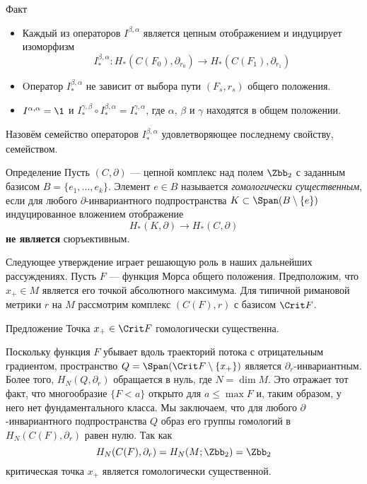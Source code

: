 \begin{thm}{Факт}\label{13.2.E}
  \begin{itemize}
  \item
    Каждый из операторов $I^{\beta,\alpha}$ является цепным
    отображением и индуцирует изоморфизм
    \[
    I^{\beta,\alpha}_{*} :
    H_{*}(C(F_{0}),\partial_{r_{0}}) \to
    H_{*}(C(F_{1}),\partial_{r_{1}})
    \]
  \item
    Oператор $I^{\beta,\alpha}_{*}$ не зависит от выбора пути
    $(F_{s},r_{s})$ общего положения.
  \item
    $I^{\alpha,\alpha}=\1$ и $I^{\gamma,\beta}_{*}\circ
    I^{\beta,\alpha}_{*}=I^{\gamma,\alpha}_{*}$, где $\alpha$, $\beta$ и
    $\gamma$ находятся в общем положении.
  \end{itemize}
\end{thm}

Назовём семейство операторов $I^{\beta,\alpha}_{*}$ удовлетворяющее
последнему свойству,  семейством. 

\begin{ex}{Определение}\label{13.2.F}
Пусть $(C, \partial)$ --- цепной комплекс над полем $\Zbb_{2}$ с заданным базисом $B = \{e_{1},\dots,e_{k}\}$.
Элемент $e\in B$ называется \emph{гомологически существенным}, если для
любого $\partial$-инвариантного подпространства $K\subset \Span(B\setminus \{e\})$ индуцированное вложением отображение
\[
H_{*}(K,\partial)\to H_{*}(C,\partial)
\]
\textbf{не является} сюръективным.
\end{ex}

Следующее утверждение играет решающую роль в наших дальнейших рассуждениях.
Пусть $F$ — функция Морса общего положения.
Предположим, что $x_{+}\in M$ является его  точкой
абсолютного максимума. 
Для типичной римановой метрики $r$ на $M$ рассмотрим комплекс
$(C(F),r)$ с базисом $\Crit F$. 

\begin{thm}{Предложение}\label{13.2.G}
  Точка $x_{+}\in\Crit F$ гомологически существенна.  
\end{thm}

 Поскольку функция $F$
убывает вдоль траекторий потока с отрицательным градиентом,
пространство
$Q \z= \Span(\Crit F \setminus \{x_{+}\})$ является $\partial_{r}$-инвариантным.
Более того, $H_{N}(Q,\partial_{r})$ обращается в нуль, где $N = \dim M$.
Это отражает тот факт, что многообразие $\{F<a\}$ открыто для $a\le
\max F$ и, таким образом, у него нет фундаментального класса. 
Мы заключаем, что для любого $\partial$-инвариантного подпространства
$Q$ образ его группы гомологий в $H_{N}(C(F),\partial_{r})$ равен
нулю. Так как
\[
H_{N}(C(F),\partial_{r})=H_{N}(M;\Zbb_{2})=\Zbb_{2}
\]
критическая точка $x_{+}$ является гомологически существенной.
\qeds

